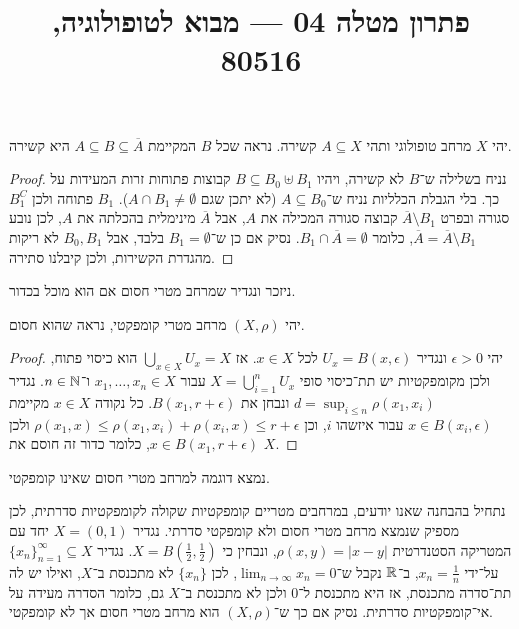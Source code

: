 
\title{פתרון מטלה 04 --- מבוא לטופולוגיה, 80516}


\maketitle
\maketitleprint[purple]

\question{}
יהי $X$ מרחב טופולוגי ותהי $A \subseteq X$ קשירה.
נראה שכל $B$ המקיימת $A \subseteq B \subseteq \overline{A}$ היא קשירה.
\begin{proof}
	נניח בשלילה ש־$B$ לא קשירה, ויהיו $B \subseteq B_0 \uplus B_1$ קבוצות פתוחות זרות המעידות על כך.
	בלי הגבלת הכלליות נניח ש־$A \subseteq B_0$ (לא יתכן שגם $A \cap B_1 \ne \emptyset$).
	$B_1$ פתוחה ולכן $B_1^C$ סגורה ובפרט $\overline{A} \setminus B_1$ קבוצה סגורה המכילה את $A$, אבל $\overline{A}$ מינימלית בהכלתה את $A$,
	לכן נובע $\overline{A} = \overline{A} \setminus B_1$, כלומר $B_1 \cap \overline{A} = \emptyset$.
	נסיק אם כן ש־$B_1 = \emptyset$ בלבד, אבל $B_0, B_1$ לא ריקות מהגדרת הקשירות, ולכן קיבלנו סתירה.
\end{proof}

\question[3]
ניזכר ונגדיר שמרחב מטרי חסום אם הוא מוכל בכדור.

\subquestion{}
יהי $(X, \rho)$ מרחב מטרי קומפקטי,
נראה שהוא חסום.
\begin{proof}
	יהי $\epsilon > 0$ ונגדיר $U_x = B(x, \epsilon)$ לכל $x \in X$.
	אז $\bigcup_{x \in X} U_x = X$ הוא כיסוי פתוח, ולכן מקומפקטיות יש תת־כיסוי סופי $X = \bigcup_{i = 1}^n U_x$ עבור $x_1, \ldots, x_n \in X$ ו־$n \in \mathbb{N}$.
	נגדיר $d = \sup_{i \le n} \rho(x_1, x_i)$ ונבחן את $B(x_1, r + \epsilon)$.
	כל נקודה $x \in X$ מקיימת $x \in B(x_i, \epsilon)$ עבור איזשהו $i$, וכן $\rho(x_1, x) \le \rho(x_1, x_i) + \rho(x_i, x) \le r + \epsilon$ ולכן $x \in B(x_1, r + \epsilon)$, כלומר כדור זה חוסם את $X$.
\end{proof}

\subquestion{}
נמצא דוגמה למרחב מטרי חסום שאינו קומפקטי.
\begin{solution}
	נתחיל בהבחנה שאנו יודעים, במרחבים מטריים קומפקטיות שקולה לקומפקטיות סדרתית, לכן מספיק שנמצא מרחב מטרי חסום ולא קומפקטי סדרתי.
	נגדיר $X = (0, 1)$ יחד עם המטריקה הסטנדרטית $\rho(x, y) = |x - y|$, ונבחין כי $X = B(\frac{1}{2}, \frac{1}{2})$.
	נגדיר ${\{ x_n \}}_{n = 1}^\infty \subseteq X$ על־ידי $x_n = \frac{1}{n}$,
	ב־$\mathbb{R}$ נקבל ש־$\lim_{n \to \infty} x_n = 0$, לכן $\{ x_n \}$ לא מתכנסת ב־$X$, ואילו יש לה תת־סדרה מתכנסת, אז היא מתכנסת ל־$0$ ולכן לא מתכנסת ב־$X$ גם, כלומר הסדרה מעידה על אי־קומפקטיות סדרתית.
	נסיק אם כך ש־$(X, \rho)$ הוא מרחב מטרי חסום אך לא קומפקטי.
\end{solution}

